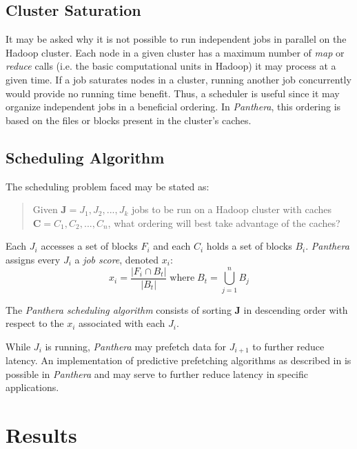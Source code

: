 \documentclass[12pt]{article}
\begin{document}
\subsection{Cluster Saturation}
It may be asked why it is not possible to run independent jobs in parallel on the Hadoop cluster. Each node in a given cluster has a maximum number of \textit{map} or \textit{reduce} calls (i.e. the basic computational units in Hadoop) it may process at a given time. If a job saturates nodes in a cluster, running another job concurrently would provide no running time benefit. Thus, a scheduler is useful since it may organize independent jobs in a beneficial ordering. In \textit{Panthera}, this ordering is based on the files or blocks present in the cluster's caches.

\subsection{Scheduling Algorithm} \label{sect:scheduling}

The scheduling problem faced may be stated as: 

\begin{quote}
Given $\mathbf{J} = J_1, J_2, ... ,J_k$ jobs to be run on a Hadoop cluster with caches $\mathbf{C} = C_1, C_2, ..., C_n$, what ordering will best take advantage of the caches?
\end{quote}

Each $J_i$ accesses a set of blocks $F_i$ and each $C_i$ holds a set of blocks $B_i$. \textit{Panthera} assigns every $J_i$ a \textit{job score}, denoted $x_i$:
			\begin{equation}
				x_i = \displaystyle{\frac{\left\vert{F_i \cap B_t}\right\vert}{ \left\vert{B_t}\right\vert}} \; \textrm{where} \;
				B_t = \bigcup_{j = 1}^{n} B_j
			\end{equation}
			
			The \textit{Panthera scheduling algorithm} consists of sorting $\mathbf{J}$ in descending order with respect to the $x_i$ associated
			with each $J_i$. 
			
		While $J_i$ is running, \textit{Panthera} may prefetch data for $J_{i+1}$ to further reduce latency. An implementation of predictive prefetching algorithms as described in \cite{griffioen1994reducing} is possible in \textit{Panthera} and may serve to further reduce latency in specific applications.

\section{Results} \label{sect:results}
\end{document}
